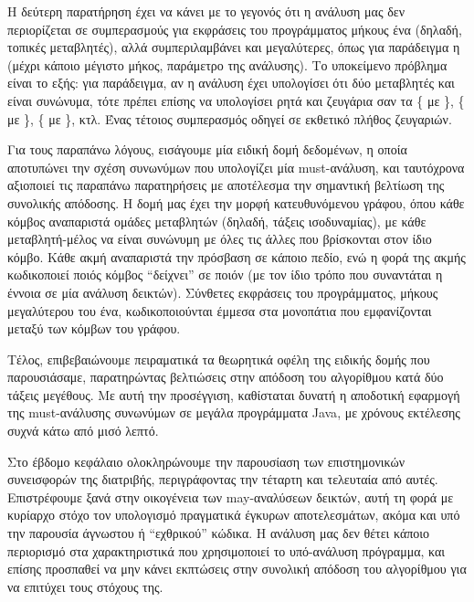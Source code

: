 Η δεύτερη παρατήρηση έχει να κάνει με το γεγονός ότι η ανάλυση μας δεν περιορίζεται σε συμπερασμούς για εκφράσεις του προγράμματος μήκους ένα (δηλαδή, τοπικές μεταβλητές), αλλά συμπεριλαμβάνει και μεγαλύτερες, όπως για παράδειγμα η {\en {}} (μέχρι κάποιο μέγιστο μήκος, παράμετρο της ανάλυσης). Το υποκείμενο πρόβλημα είναι το εξής: για παράδειγμα, αν η ανάλυση έχει υπολογίσει ότι δύο μεταβλητές {\en {}} και {\en {}} είναι συνώνυμα, τότε πρέπει επίσης να υπολογίσει ρητά και ζευγάρια σαν τα \{{\en {}} με {\en {}}\}, \{{\en {}} με {\en {}}\}, \{{\en {}} με {\en {}}\}, κτλ. Ένας τέτοιος συμπερασμός οδηγεί σε εκθετικό πλήθος ζευγαριών.

Για τους παραπάνω λόγους, εισάγουμε μία ειδική δομή δεδομένων, η οποία αποτυπώνει την σχέση συνωνύμων που υπολογίζει μία {\en must}-ανάλυση, και ταυτόχρονα αξιοποιεί τις παραπάνω παρατηρήσεις με αποτέλεσμα την σημαντική βελτίωση της συνολικής απόδοσης. Η δομή μας έχει την μορφή κατευθυνόμενου γράφου, όπου κάθε κόμβος αναπαριστά ομάδες μεταβλητών (δηλαδή, τάξεις ισοδυναμίας), με κάθε μεταβλητή-μέλος να είναι συνώνυμη με όλες τις άλλες που βρίσκονται στον ίδιο κόμβο. Κάθε ακμή αναπαριστά την πρόσβαση σε κάποιο πεδίο, ενώ η φορά της ακμής κωδικοποιεί ποιός κόμβος ``δείχνει'' σε ποιόν (με τον ίδιο τρόπο που συναντάται η έννοια σε μία ανάλυση δεικτών). Σύνθετες εκφράσεις του προγράμματος, μήκους μεγαλύτερου του ένα, κωδικοποιούνται έμμεσα στα μονοπάτια που εμφανίζονται μεταξύ των κόμβων του γράφου.

Τέλος, επιβεβαιώνουμε πειραματικά τα θεωρητικά οφέλη της ειδικής δομής που παρουσιάσαμε, παρατηρώντας βελτιώσεις στην απόδοση του αλγορίθμου κατά δύο τάξεις μεγέθους. Με αυτή την προσέγγιση, καθίσταται δυνατή η αποδοτική εφαρμογή της {\en must}-ανάλυσης συνωνύμων σε μεγάλα προγράμματα {\en Java}, με χρόνους εκτέλεσης συχνά κάτω από μισό λεπτό.


Στο έβδομο κεφάλαιο ολοκληρώνουμε την παρουσίαση των επιστημονικών συνεισφορών της διατριβής, περιγράφοντας την τέταρτη και τελευταία από αυτές. Επιστρέφουμε ξανά στην οικογένεια των {\en may}-αναλύσεων δεικτών, αυτή τη φορά με κυρίαρχο στόχο τον υπολογισμό πραγματικά έγκυρων αποτελεσμάτων, ακόμα και υπό την παρουσία άγνωστου ή ``εχθρικού'' κώδικα. Η ανάλυση μας δεν θέτει κάποιο περιορισμό στα χαρακτηριστικά που χρησιμοποιεί το υπό-ανάλυση πρόγραμμα, και επίσης προσπαθεί να μην κάνει εκπτώσεις στην συνολική απόδοση του αλγορίθμου για να επιτύχει τους στόχους της.

